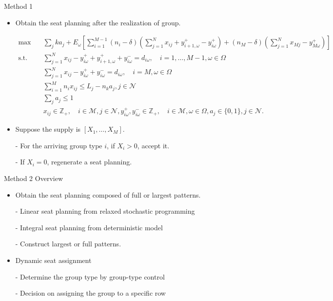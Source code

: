   \begin{frame}{Method 1}
    \scriptsize
    \begin{itemize}
      \item Obtain the seat planning after the realization of group.
      \begin{tiny}
        \begin{equation}
        \begin{aligned}
        \max \quad & \sum_{j} k a_j + E_{\omega}\left[\sum_{i=1}^{M-1} (n_i-\delta) (\sum_{j= 1}^{N} x_{ij} + y_{i+1,\omega}^{+} - y_{i \omega}^{+}) + (n_{M}-\delta) (\sum_{j= 1}^{N} x_{Mj} - y_{M \omega}^{+})\right] \\
        \text {s.t.} \quad & \sum_{j= 1}^{N} x_{ij}-y_{i \omega}^{+}+
        y_{i+1, \omega}^{+} + y_{i \omega}^{-}=d_{i \omega}, \quad i = 1,\ldots,M-1, \omega \in \Omega \\
        & \sum_{j= 1}^{N} x_{ij} -y_{i \omega}^{+}+y_{i \omega}^{-}=d_{i \omega}, \quad i = M, \omega \in \Omega \\
        & \sum_{i=1}^{M} n_{i} x_{ij} \leq L_j - n_k a_j, j \in \mathcal{N} \\
        & \sum_{j} a_j \leq 1 \\
        & x_{ij} \in \mathbb{Z}_{+}, \quad i \in \mathcal{M}, j \in \mathcal{N}, y_{i \omega}^{+}, y_{i \omega}^{-} \in \mathbb{Z}_{+}, \quad i \in \mathcal{M}, \omega \in \Omega,  a_j \in \{0,1\}, j \in \mathcal{N}.
        \end{aligned}
      \end{equation}
    \end{tiny}
      \item Suppose the supply is $[X_{1}, \ldots, X_M]$.
      \item[-] For the arriving group type $i$, if $X_i > 0$, accept it. 
      
      \item[-] If $X_i = 0$, regenerate a seat planning.
    \end{itemize}
  \end{frame}

  \begin{frame}{Method 2 Overview}
    \begin{itemize}
      \item Obtain the seat planning composed of full or largest patterns.
      
      - Linear seat planning from relaxed stochastic programming
      
      - Integral seat planning from deterministic model
  
      - Construct largest or full patterns.
  
      \item Dynamic seat assignment
  
      - Determine the group type by group-type control
  
      - Decision on assigning the group to a specific row

    \end{itemize}
  \end{frame}
    
